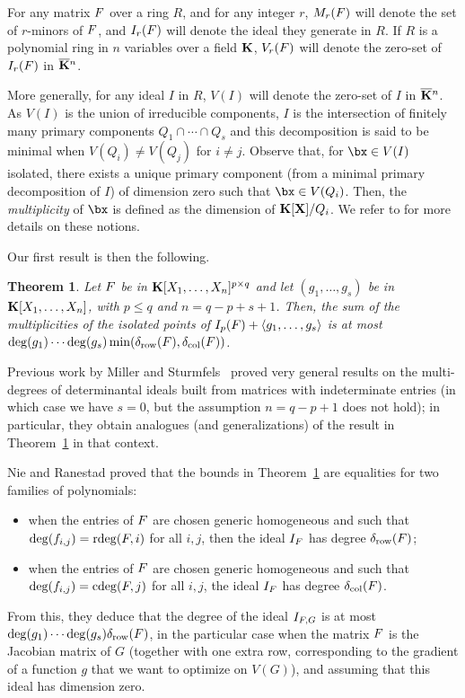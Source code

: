 \documentclass[12pt]{article}
\newtheorem{theorem}[definition]{Theorem}
\begin{document}
\smallskip
For any matrix ${F}$ over a ring $R$, and for any integer $r$,
$M_r({F})$ will denote the set of $r$-minors of ${F}$, and $I_r({F})$
will denote the ideal they generate in $R$. If $R$ is a polynomial
ring in $n$ variables over a field $\mathbf{K}$, $V_r({F})$ will denote the
zero-set of $I_r({F})$ in $\overline{\mathbf{K}}{}^n$. 

More generally, for any ideal $I$ in $R$, $V(I)$ will denote the
zero-set of $I$ in $\overline{\mathbf{K}}{}^n$. As $V(I)$ is the union of irreducible
components, $I$ is the intersection of finitely many primary
components $Q_1\cap\cdots \cap Q_s$ and this decomposition is said to
be minimal when $V(Q_i)\neq V(Q_j)$ for $i\neq j$. Observe that, for
$\bx \in V(I)$ isolated, there exists a unique primary component (from
a minimal primary decomposition of $I$) of dimension zero such that
$\bx \in V(Q_i)$. Then, the \emph{multiplicity} of $\bx$ is defined as
the dimension of $\mathbf{K}[\mathbf{X}]/Q_i$. We refer to \cite{Eisenbud95} for more
details on these notions.

\smallskip
Our first result is then the following.
\begin{theorem}\label{theo:1}
  Let ${F}$ be in $\mathbf{K}[X_1,\dots,X_n]^{p \times q}$ and let
  $(g_1,\dots,g_s)$ be in $\mathbf{K}[X_1,\dots,X_n]$, with $p \le q$ and
  $n=q-p+s+1$. Then, the sum of the multiplicities of the isolated
  points of $I_p({F}) + \langle g_1,\dots,g_s \rangle$ is at most
  $\deg(g_1) \cdots \deg(g_s) \min(\delta_{\rm row}({F}), \delta_{\rm
    col}({F}))$.
\end{theorem}
Previous work by Miller and Sturmfels~\cite[Chapter~15]{MiSt04} proved
very general results on the multi-degrees of determinantal ideals
built from matrices with indeterminate entries (in which case we have
$s=0$, but the assumption $n=q-p+1$ does not hold); in particular,
they obtain analogues (and generalizations) of the result in
Theorem~\ref{theo:1} in that context.

Nie and Ranestad proved that the bounds in Theorem~\ref{theo:1} are
equalities for two families of polynomials:
\begin{itemize}
\item when the entries of ${F}$ are chosen generic homogeneous and
  such that $\deg(f_{i,j}) = \mathrm{rdeg}({F},i)$ for all $i,j$, then the
  ideal $I_{{F}}$ has degree $\delta_{\rm row}({F})$;
\item when the entries of ${F}$ are chosen generic homogeneous and
  such that $\deg(f_{i,j}) = \mathrm{cdeg}({F},j)$ for all $i,j$, the ideal
  $I_{{F}}$ has degree $\delta_{\rm col}({F})$.
\end{itemize}
From this, they deduce that the degree of the ideal $I_{{F},G}$ is at
most $\deg(g_1) \cdots \deg(g_s) \delta_{\rm row}({F})$, in the
particular case when the matrix ${F}$ is the Jacobian matrix of $G$
(together with one extra row, corresponding to the gradient of a
function $g$ that we want to optimize on $V(G)$), and assuming that
this ideal has dimension zero.
\end{document}
